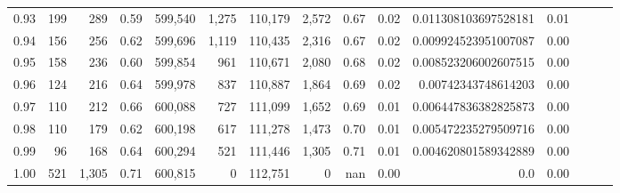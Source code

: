 \begin{tabular}{rrrrrrrrrrrrrrr}
0.93 &     199 &    289 &  0.59 &  599,540 &    1,275 &  110,179 &    2,572 &  0.67 &  0.02 &  0.011308103697528181 &      0.01 \\
0.94 &     156 &    256 &  0.62 &  599,696 &    1,119 &  110,435 &    2,316 &  0.67 &  0.02 &  0.009924523951007087 &      0.00 \\
0.95 &     158 &    236 &  0.60 &  599,854 &      961 &  110,671 &    2,080 &  0.68 &  0.02 &  0.008523206002607515 &      0.00 \\
0.96 &     124 &    216 &  0.64 &  599,978 &      837 &  110,887 &    1,864 &  0.69 &  0.02 &   0.00742343748614203 &      0.00 \\
0.97 &     110 &    212 &  0.66 &  600,088 &      727 &  111,099 &    1,652 &  0.69 &  0.01 &  0.006447836382825873 &      0.00 \\
0.98 &     110 &    179 &  0.62 &  600,198 &      617 &  111,278 &    1,473 &  0.70 &  0.01 &  0.005472235279509716 &      0.00 \\
0.99 &      96 &    168 &  0.64 &  600,294 &      521 &  111,446 &    1,305 &  0.71 &  0.01 &  0.004620801589342889 &      0.00 \\
1.00 &     521 &  1,305 &  0.71 &  600,815 &        0 &  112,751 &        0 &   nan &  0.00 &                   0.0 &      0.00 \\
\bottomrule
\end{tabular}
